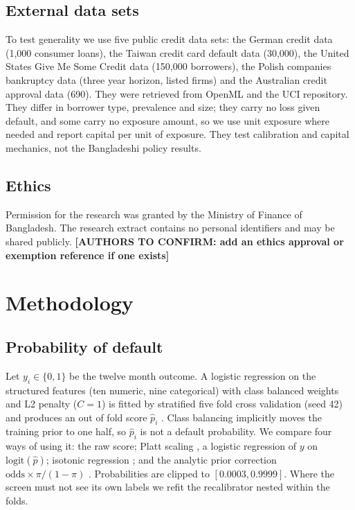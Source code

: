 \documentclass[11pt,a4paper]{article}
\newcommand{\AUTHORCHECK}[1]{{\color{red}\textbf{[AUTHORS TO CONFIRM: #1]}}}
\begin{document}
\subsection{External data sets}
To test generality we use five public credit data sets: the German credit data \citep{Hofmann1994} (1{,}000 consumer loans), the Taiwan credit card default data \citep{Yeh2009} (30{,}000), the United States Give Me Some Credit data (150{,}000 borrowers), the Polish companies bankruptcy data (three year horizon, listed firms) and the Australian credit approval data (690). They were retrieved from OpenML and the UCI repository. They differ in borrower type, prevalence and size; they carry no loss given default, and some carry no exposure amount, so we use unit exposure where needed and report capital per unit of exposure. They test calibration and capital mechanics, not the Bangladeshi policy results.

\subsection{Ethics}
Permission for the research was granted by the Ministry of Finance of Bangladesh. The research extract contains no personal identifiers and may be shared publicly. \AUTHORCHECK{add an ethics approval or exemption reference if one exists}

\section{Methodology}\label{sec:method}
\subsection{Probability of default}
Let $y_i\in\{0,1\}$ be the twelve month outcome. A logistic regression on the structured features (ten numeric, nine categorical) with class balanced weights and L2 penalty ($C=1$) is fitted by stratified five fold cross validation (seed 42) and produces an out of fold score $\hat p_i$ \citep{Pedregosa2011}. Class balancing implicitly moves the training prior to one half, so $\hat p_i$ is not a default probability. We compare four ways of using it: the raw score; Platt scaling \citep{Platt1999}, a logistic regression of $y$ on $\mathrm{logit}(\hat p)$; isotonic regression \citep{ZadroznyElkan2002}; and the analytic prior correction $\mathrm{odds}\times\pi/(1-\pi)$ \citep{Saerens2002}. Probabilities are clipped to $[0.0003,0.9999]$. Where the screen must not see its own labels we refit the recalibrator nested within the folds.
\end{document}

